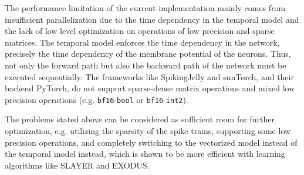     The performance limitation of the current implementation mainly comes from insufficient parallelization due to the time dependency in the temporal model and the lack of low level optimization on operations of low precision and sparse matrices. The temporal model enforces the time dependency in the network, precisely the time dependency of the membrane potential of the neurons. Thus, not only the forward path but also the backward path of the network must be executed sequentially. The frameworks like SpikingJelly and snnTorch, and their backend PyTorch, do not support sparse-dense matrix operations and mixed low precision operations (e.g. \verb|bf16|-\verb|bool| or \verb|bf16|-\verb|int2|). 

    The problems stated above can be considered as sufficient room for further optimization, e.g. utilizing the sparsity of the spike trains, supporting some low precision operations, and completely switching to the vectorized model instead of the temporal model instead, which is shown to be more efficient with learning algorithms like SLAYER and EXODUS. 
